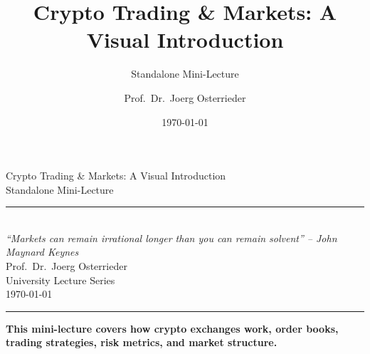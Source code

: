 \documentclass[8pt,aspectratio=169]{beamer}
\title{Crypto Trading \& Markets: A Visual Introduction}
\subtitle{Standalone Mini-Lecture}
\author{Prof.~Dr.~Joerg Osterrieder}
\institute{University Lecture Series}
\date{\today}
\newcommand{\bottomnote}[1]{%
\vfill
\vspace{-2mm}
\textcolor{mllavender2}{\rule{\textwidth}{0.4pt}}
\vspace{1mm}
\footnotesize
\textbf{#1}
}
\begin{document}
\begin{frame}[plain]
\vspace{2cm}
\begin{center}
{\Huge\color{mlpurple} Crypto Trading \& Markets: A Visual Introduction}\\[0.4cm]
{\Large\color{mlblue} Standalone Mini-Lecture}\\[0.3cm]
\textcolor{mlgray}{\rule{6cm}{0.4pt}}\\[0.3cm]
{\small\itshape ``Markets can remain irrational longer than you can remain solvent'' -- John Maynard Keynes}\\[1.5cm]
{\normalsize Prof.~Dr.~Joerg Osterrieder}\\[0.2cm]
{\small University Lecture Series}\\[0.2cm]
{\small \today}
\end{center}

\bottomnote{This mini-lecture covers how crypto exchanges work, order books, trading strategies, risk metrics, and market structure.}
\end{frame}
\end{document}
